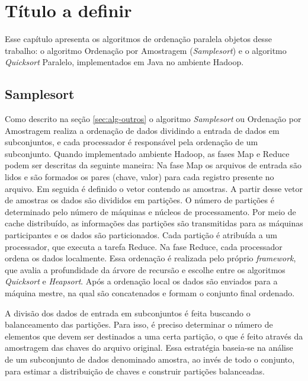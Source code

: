 %
%

\chapter{Título a definir}
\label{chap:tituloadefinir}

Esse capítulo apresenta os algoritmos de ordenação paralela objetos desse trabalho: o algoritmo Ordenação por Amostragem  (\textit{Samplesort}) e o algoritmo \textit{Quicksort} Paralelo, implementados em Java no ambiente Hadoop. 

\section{Samplesort}
\label{sec:sampleSort}

Como descrito na seção \ref{sec:alg-outros} o algoritmo \textit{Samplesort} ou Ordenação por Amostragem realiza a ordenação de dados dividindo a entrada de dados em subconjuntos, e cada processador é responsável pela ordenação de um subconjunto. 
Quando implementado ambiente Hadoop, as fases Map e Reduce podem ser descritas da seguinte maneira: 
Na fase Map os arquivos de entrada são lidos e são formados os pares (chave, valor) para cada registro presente no arquivo. 
Em seguida é definido o vetor contendo as amostras. A partir desse vetor de amostras os dados são divididos em partições. O número de partições é determinado pelo número de máquinas e núcleos de processamento. 
Por meio de cache distribuído, as informações das partições são transmitidas para as máquinas participantes e os dados são particionados. Cada partição é atribuída a um processador, que executa a tarefa Reduce. 
Na fase Reduce, cada processador ordena os dados localmente. Essa ordenação é realizada pelo próprio \textit{framework}, que avalia a profundidade da árvore de recursão e escolhe entre os  algoritmos \textit{Quicksort} e \textit{Heapsort}. 
Após a ordenação local os dados são enviados para a máquina mestre, na qual são concatenados e formam o conjunto final ordenado.

A divisão dos dados de entrada em subconjuntos é feita buscando o balanceamento das partições. Para isso, é preciso determinar o número de elementos que devem ser destinados a uma certa partição, o que é feito através da amostragem das chaves do arquivo original. Essa estratégia baseia-se na análise de um subconjunto de dados  denominado amostra, ao invés de todo o conjunto, para estimar a distribuição de chaves e construir partições balanceadas.

